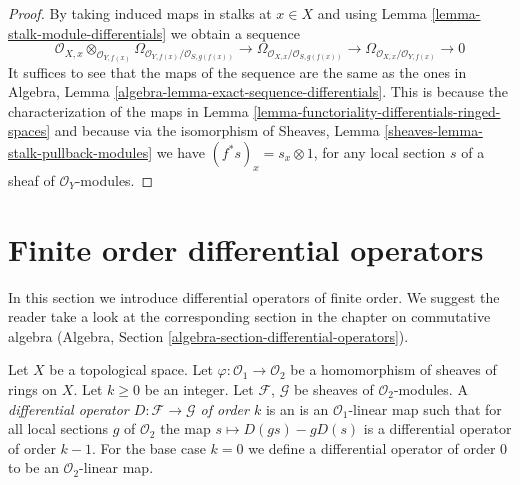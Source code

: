 \begin{proof}
By taking induced maps in stalks at $x \in X$ and using
Lemma \ref{lemma-stalk-module-differentials} we obtain a sequence
$$
\mathcal{O}_{X, x} \otimes_{\mathcal{O}_{Y, f(x)}}
\Omega_{\mathcal{O}_{Y, f(x)}/\mathcal{O}_{S, g(f(x))}} \to
\Omega_{\mathcal{O}_{X, x}/\mathcal{O}_{S, g(f(x))}} \to
\Omega_{\mathcal{O}_{X, x}/\mathcal{O}_{Y, f(x)}} \to 0
$$
It suffices to see that the maps of the sequence are the same as
the ones in Algebra, Lemma \ref{algebra-lemma-exact-sequence-differentials}.
This is because the characterization of the maps in
Lemma \ref{lemma-functoriality-differentials-ringed-spaces}
and because via the isomorphism of
Sheaves, Lemma \ref{sheaves-lemma-stalk-pullback-modules}
we have $(f^*s)_x = s_x \otimes 1$,
for any local section $s$ of a sheaf of $\mathcal{O}_Y$-modules.
\end{proof}


















\section{Finite order differential operators}
\label{section-differential-operators}

\noindent
In this section we introduce differential operators of finite order.
We suggest the reader take a look at the corresponding section
in the chapter on commutative algebra
(Algebra, Section \ref{algebra-section-differential-operators}).

\begin{definition}
\label{definition-differential-operators}
Let $X$ be a topological space. Let $\varphi : \mathcal{O}_1 \to \mathcal{O}_2$
be a homomorphism of sheaves of rings on $X$. Let $k \geq 0$ be an integer.
Let $\mathcal{F}$, $\mathcal{G}$ be sheaves of $\mathcal{O}_2$-modules.
A {\it differential operator $D : \mathcal{F} \to \mathcal{G}$ of order $k$}
is an is an $\mathcal{O}_1$-linear map such that for all local sections
$g$ of $\mathcal{O}_2$ the map $s \mapsto D(gs) - gD(s)$ is a
differential operator of order $k - 1$. For the base case $k = 0$
we define a differential operator of order $0$ to be an
$\mathcal{O}_2$-linear map.
\end{definition}

